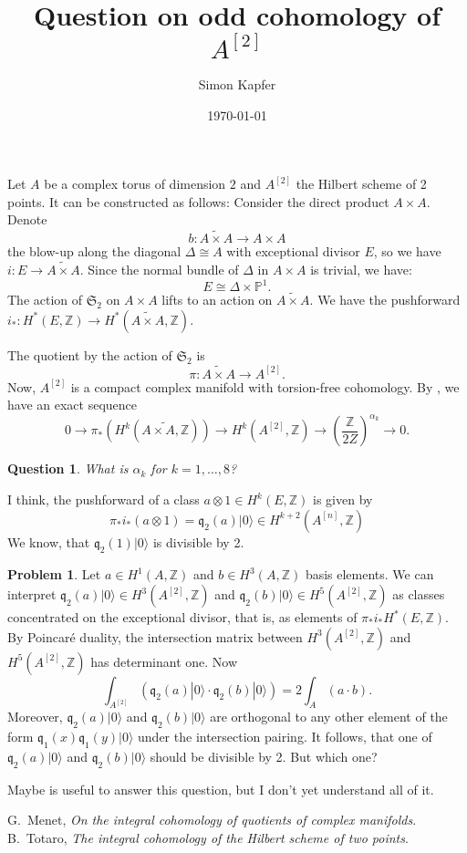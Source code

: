 \documentclass{amsart}
\newcommand{\hilb}[1]{^{[#1]}}
\newcommand{\vac}{|0\rangle}
\newcommand{\q}{\mathfrak{q}}
\newcommand{\Z}{\mathbb{Z}}
\theoremstyle{plain}
\newtheorem{question}[theorem]{Question}
\theoremstyle{definition}
\newtheorem{problem}[theorem]{Problem}
\theoremstyle{remark}
\begin{document}
\title{Question on odd cohomology of $A\hilb{2}$}

\author{Simon Kapfer}

\date{\today}


\maketitle

Let $A$ be a complex torus of dimension $2$ and $A\hilb{2}$ the Hilbert scheme of 2 points. It can be constructed as follows: Consider the direct product $A\times A$. Denote 
$$b: \widetilde{A\times A} \rightarrow A\times A $$ 
the blow-up along the diagonal $\Delta \cong A$ with exceptional divisor $E$, so we have $i: E\rightarrow \widetilde{A\times A}  $. Since the normal bundle of $\Delta$ in $A\times A$ is trivial, we have:
$$
E \cong  \Delta\times \mathbb{P}^1.
$$
The action of $\mathfrak{S}_2$ on $A\times A$ lifts to an action on $\widetilde{A\times A}$. 
We have the pushforward $i_*:H^*(E,\Z)\rightarrow H^*(\widetilde{A\times A} ,\Z) $.

The quotient by the action of $\mathfrak{S}_2$ is 
$$ \pi:\widetilde{A\times A} \rightarrow A\hilb{2}.$$ 
Now, $A\hilb{2}$ is a compact complex manifold with torsion-free cohomology.
By \cite{Menet}, we have an exact sequence
$$
0 \rightarrow \pi_*(H^k(\widetilde{A\times A,\Z})) \rightarrow H^k(A\hilb{2},\Z) \rightarrow \left(\frac{\Z}{2{Z}}\right)^{\alpha_k}\rightarrow 0.
$$
\begin{question}
What is $\alpha_k$ for $k= 1,\ldots, 8$? 
\end{question}
I think, the pushforward of a class $a\otimes 1 \in H^{k}(E,\Z)$ is given by 
$$
\pi_* i_*(a\otimes 1) = \q_2(a)\vac \in H^{k+2}(A\hilb{n},\Z)
$$
We know, that $\q_2(1)\vac$ is divisible by 2.
\begin{problem}
Let $a\in H^1(A,\Z)$ and $b\in H^3(A,\Z)$ basis elements. We can interpret $\q_2(a)\vac\in H^3(A\hilb{2},\Z)$ and $\q_2(b)\vac\in H^5(A\hilb{2},\Z)$ as classes concentrated on the exceptional divisor, that is, as elements of $\pi_* i_*H^*(E,\Z)$. By Poincar\'e duality, the intersection matrix between $H^3(A\hilb{2},\Z)$ and $H^5(A\hilb{2},\Z)$ has determinant one. Now 
$$
 \int_{A\hilb{2}}\left(\q_2(a)\vac\cdot\q_2(b)\vac \right)= 2\int_A \left(a\cdot b\right).
$$
Moreover, $\q_2(a)\vac $ and $\q_2(b)\vac$ are orthogonal to any other element of the form $\q_1(x)\q_1(y)\vac$ under the intersection pairing. It follows, that one of $\q_2(a)\vac $ and $\q_2(b)\vac$ should be divisible by 2. But which one?
\end{problem}
Maybe  \cite{Totaro} is useful to answer this question, but I don't yet understand all of it.





\begin{thebibliography}{10}

G.~Menet, \emph{On the integral cohomology of quotients of complex manifolds}.
B.~Totaro, \emph{The integral cohomology of the Hilbert scheme of two points}.
\end{thebibliography}
\end{document}
